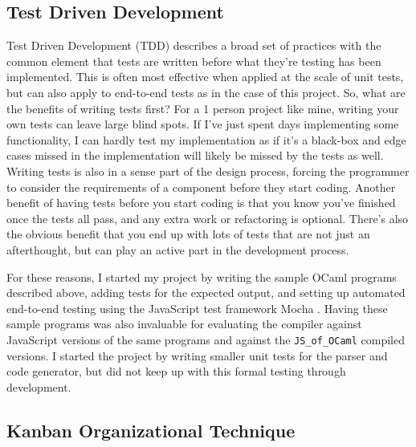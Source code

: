 \documentclass[12pt,a4paper,twoside,openright]{report}
\newcommand{\JSofOCaml}{{\tt JS\_of\_OCaml} }
\begin{document}
\subsection{Test Driven Development}
Test Driven Development (TDD) describes a broad set of practices with the common element that tests are written before what they're testing has been implemented.
This is often most effective when applied at the scale of unit tests, but can also apply to end-to-end tests as in the case of this project.
So, what are the benefits of writing tests first?
For a 1 person project like mine, writing your own tests can leave large blind spots.
If I've just spent days implementing some functionality, I can hardly test my implementation as if it's a black-box and edge cases missed in the implementation will likely be missed by the tests as well.
Writing tests is also in a sense part of the design process, forcing the programmer to consider the requirements of a component before they start coding.
Another benefit of having tests before you start coding is that you know you've finished once the tests all pass, and any extra work or refactoring is optional.
There's also the obvious benefit that you end up with lots of tests that are not just an afterthought, but can play an active part in the development process.

For these reasons, I started my project by writing the sample OCaml programs described above, adding tests for the expected output, and setting up automated end-to-end testing using the JavaScript test framework Mocha \cite{mochaorg}.
Having these sample programs was also invaluable for evaluating the compiler against JavaScript versions of the same programs and against the \JSofOCaml \cite{jsofocaml} compiled versions.
I started the project by writing smaller unit tests for the parser and code generator, but did not keep up with this formal testing through development.

\subsection{Kanban Organizational Technique}
\end{document}
